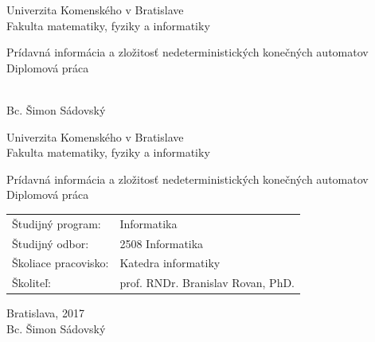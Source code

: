 \documentclass[12pt, oneside]{book}
\def\mfrok{2017}
\def\mfnazov{Prídavná informácia a zložitosť nedeterministických konečných automatov}
\def\mftyp{Diplomová práca}
\def\mfautor{Bc. Šimon Sádovský}
\def\mfskolitel{prof. RNDr. Branislav Rovan, PhD.}
\def\mfkonzultant{tit. Meno Priezvisko, tit. }
\def\mfmiesto{Bratislava, \mfrok}
\def\mfodbor{2508 Informatika}
\def\program{ Informatika }
\def\mfpracovisko{ Katedra informatiky }
\begin{document}
     

\thispagestyle{empty}

\begin{center}
\sc\large
Univerzita Komenského v Bratislave\\
Fakulta matematiky, fyziky a informatiky

\vfill

{\LARGE\mfnazov}\\
\mftyp
\end{center}

\vfill

{\sc\large 
\noindent \mfrok\\
\mfautor
}

\eject %


\thispagestyle{empty}
\noindent

\begin{center}
\sc  
\large
Univerzita Komenského v Bratislave\\
Fakulta matematiky, fyziky a informatiky

\vfill

{\LARGE\mfnazov}\\
\mftyp
\end{center}

\vfill

\noindent
\begin{tabular}{ll}
Študijný program: & \program \\
Študijný odbor: & \mfodbor \\
Školiace pracovisko: & \mfpracovisko \\
Školiteľ: & \mfskolitel \\
\end{tabular}

\vfill


\noindent \mfmiesto\\
\mfautor

\eject %




\end{document}
